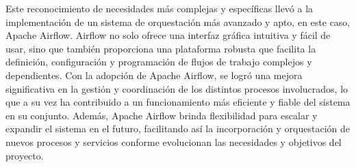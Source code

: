 Este reconocimiento de necesidades más complejas y específicas llevó a la implementación de un sistema de orquestación más avanzado y apto, en este caso, Apache Airflow. Airflow no solo ofrece una interfaz gráfica intuitiva y fácil de usar, sino que también proporciona una plataforma robusta que facilita la definición, configuración y programación de flujos de trabajo complejos y dependientes. Con la adopción de Apache Airflow, se logró una mejora significativa en la gestión y coordinación de los distintos procesos involucrados, lo que a su vez ha contribuido a un funcionamiento más eficiente y fiable del sistema en su conjunto. Además, Apache Airflow brinda flexibilidad para escalar y expandir el sistema en el futuro, facilitando así la incorporación y orquestación de nuevos procesos y servicios conforme evolucionan las necesidades y objetivos del proyecto.